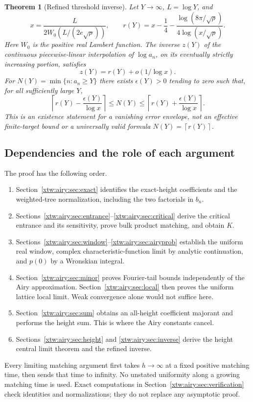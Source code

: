 \documentclass[11pt]{article}
\newtheorem{theorem}{Theorem}[section]
\theoremstyle{remark}\newtheorem{remark}[theorem]{Remark}
\newcommand{\ceil}[1]{\left\lceil #1\right\rceil}
\begin{document}
\begin{theorem}[Refined threshold inverse]\label{xtw:airy:thm:inverseintro}
Let $Y\to\infty$, $L=\log Y$, and
\begin{equation}\label{xtw:airy:eq:Lambertintro}
 x=\frac{L}{2W_0\!\left(L/(2e\sqrt\rho)\right)},\qquad
 r(Y)=x-\frac14-\frac{\log(8\pi/\sqrt\rho)}{4\log(x/\sqrt\rho)}.
\end{equation}
Here $W_0$ is the positive real Lambert function. The inverse $z(Y)$ of the
continuous piecewise-linear interpolation of $\log a_n$, on its eventually
strictly increasing portion, satisfies
\begin{equation}\label{xtw:airy:eq:zintro}
 z(Y)=r(Y)+o(1/\log x).
\end{equation}
For $N(Y)=\min\{n:a_n\ge Y\}$ there exists $\epsilon(Y)>0$ tending to zero such
that, for all sufficiently large $Y$,
\begin{equation}\label{xtw:airy:eq:sandwichintro}
 \ceil{r(Y)-\frac{\epsilon(Y)}{\log x}}
 \le N(Y)\le
 \ceil{r(Y)+\frac{\epsilon(Y)}{\log x}}.
\end{equation}
This is an existence statement for a vanishing error envelope, not an effective
finite-target bound or a universally valid formula $N(Y)=\ceil{r(Y)}$.
\end{theorem}

\subsection{Dependencies and the role of each argument}
The proof has the following order.
\begin{enumerate}
\item Section~\ref{xtw:airy:sec:exact} identifies the exact-height coefficients and the
weighted-tree normalization, including the two factorials in $b_n$.
\item Sections~\ref{xtw:airy:sec:entrance}--\ref{xtw:airy:sec:critical} derive the critical
entrance and its sensitivity, prove bulk product matching, and obtain $K$.
\item Sections~\ref{xtw:airy:sec:window}--\ref{xtw:airy:sec:airyprob} establish the uniform real
window, complex characteristic-function limit by analytic continuation, and
$p(0)$ by a Wronskian integral.
\item Section~\ref{xtw:airy:sec:minor} proves Fourier-tail bounds independently of the
Airy approximation. Section~\ref{xtw:airy:sec:local} then proves the uniform lattice
local limit. Weak convergence alone would not suffice here.
\item Section~\ref{xtw:airy:sec:sum} obtains an all-height coefficient majorant and
performs the height sum. This is where the Airy constants cancel.
\item Sections~\ref{xtw:airy:sec:height} and \ref{xtw:airy:sec:inverse} derive the height central
limit theorem and the refined inverse.
\end{enumerate}
Every limiting matching argument first takes $h\to\infty$ at a fixed positive
matching time, then sends that time to infinity. No unstated uniformity along a
growing matching time is used. Exact computations in Section~\ref{xtw:airy:sec:verification}
check identities and normalizations; they do not replace any asymptotic proof.
\end{document}

